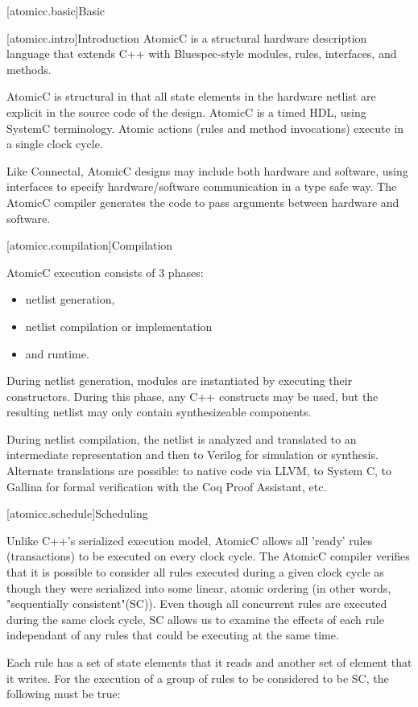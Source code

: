 [atomicc.basic]{Basic}

[atomicc.intro]{Introduction}
AtomicC is a structural hardware description language that extends C++
with Bluespec-style modules, rules, interfaces, and methods.

AtomicC is structural in that all state elements in the hardware
netlist are explicit in the source code of the design. AtomicC is a
timed HDL, using SystemC terminology. 
Atomic actions (rules and method invocations) execute in a single clock cycle.

Like Connectal, AtomicC designs may include both hardware and
software, using interfaces to specify hardware/software communication
in a type safe way. The AtomicC compiler generates the code to pass
arguments between hardware and software.

[atomicc.compilation]{Compilation}

AtomicC execution consists of 3 phases:
\begin{itemize}
\item netlist generation, 
\item netlist compilation or implementation
\item and runtime.
\end{itemize}

During netlist
generation, modules are instantiated by executing their
constructors. During this phase, any C++ constructs may be used, but
the resulting netlist may only contain synthesizeable components.

During netlist compilation, the netlist is analyzed and translated to
an intermediate representation and then to Verilog for simulation or
synthesis. Alternate translations are possible: to native code via
LLVM, to System C, to Gallina for formal verification with the Coq
Proof Assistant, etc.

[atomicc.schedule]{Scheduling}

Unlike C++'s serialized execution model, AtomicC allows all 'ready' rules (transactions) to be executed on
every clock cycle.  The AtomicC compiler verifies that it is possible to consider
all rules executed during a given clock cycle
as though they were serialized into some linear, atomic ordering (in other words, "sequentially consistent"(SC)).
Even though all concurrent rules are executed during the same clock cycle, SC allows us to examine the
effects of each rule independant of any rules that could be executing at the same time.

Each rule has a set of state elements that it reads and another set of element that it writes.
For the execution of a group of rules to be considered to be SC, the following must
be true:

